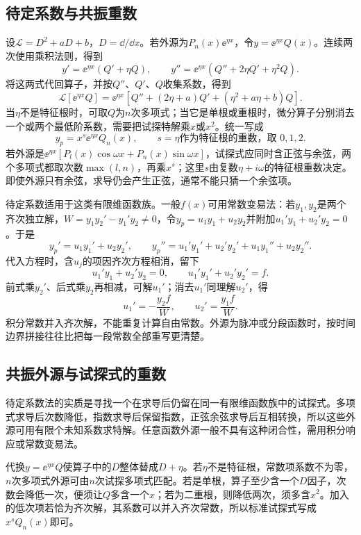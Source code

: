 \subsection{待定系数与共振重数}
设$\mathcal L=D^2+aD+b$，$D=\dd/\dd x$。若外源为$P_n(x)\ee^{\eta x}$，令$y=\ee^{\eta x}Q(x)$。连续两次使用乘积法则，得到
\[
 y'=\ee^{\eta x}(Q'+\eta Q),\qquad
 y''=\ee^{\eta x}(Q''+2\eta Q'+\eta^2Q).
\]
将这两式代回算子，并按$Q''$、$Q'$、$Q$收集系数，得到
\begin{equation}\mathcal L[\ee^{\eta x}Q]=\ee^{\eta x}
\left[Q''+(2\eta+a)Q'+(\eta^2+a\eta+b)Q\right].
\end{equation}
当$\eta$不是特征根时，可取$Q$为$n$次多项式；当它是单根或重根时，微分算子分别消去一个或两个最低阶系数，需要把试探特解乘$x$或$x^2$。统一写成
\[y_p=x^s\ee^{\eta x}Q_n(x),\qquad
s=\eta\text{作为特征根的重数，取 }0,1,2.
\]
若外源是$\ee^{\eta x}[P_l(x)\cos\omega x+P_n(x)\sin\omega x]$，试探式应同时含正弦与余弦，两个多项式都取次数$\max(l,n)$，再乘$x^s$；这里$s$由复数$\eta+i\omega$的特征根重数决定。即使外源只有余弦，求导仍会产生正弦，通常不能只猜一个余弦项。

待定系数适用于这类有限维函数族。一般$f(x)$可用常数变易法：若$y_1,y_2$是两个齐次独立解，$W=y_1y_2'-y_1'y_2\ne0$，令$y_p=u_1y_1+u_2y_2$并附加$u_1'y_1+u_2'y_2=0$。于是
\[y_p'=u_1y_1'+u_2y_2',\qquad
y_p''=u_1'y_1'+u_2'y_2'+u_1y_1''+u_2y_2''.\]
代入方程时，含$u_j$的项因齐次方程相消，留下
\[u_1'y_1+u_2'y_2=0,\qquad u_1'y_1'+u_2'y_2'=f.\]
前式乘$y_2'$、后式乘$y_2$再相减，可解$u_1'$；消去$u_1'$同理解$u_2'$，得
\[u_1'=-\frac{y_2f}{W},\qquad u_2'=\frac{y_1f}{W}.
\]
积分常数并入齐次解，不能重复计算自由常数。外源为脉冲或分段函数时，按时间边界拼接往往比把每一段常数全部重写更清楚。

\subsection{共振外源与试探式的重数}
待定系数法的实质是寻找一个在求导后仍留在同一有限维函数族中的试探式。多项式求导后次数降低，指数求导后保留指数，正弦余弦求导后互相转换，所以这些外源可用有限个未知系数求特解。任意函数外源一般不具有这种闭合性，需用积分响应或常数变易法。

代换$y=\ee^{\eta x}Q$使算子中的$D$整体替成$D+\eta$。若$\eta$不是特征根，常数项系数不为零，$n$次多项式外源可由$n$次试探多项式匹配。若是单根，算子至少含一个$D$因子，次数会降低一次，便须让$Q$多含一个$x$；若为二重根，则降低两次，须多含$x^2$。加入的低次项若恰为齐次解，其系数可以并入齐次常数，所以标准试探式写成$x^sQ_n(x)$即可。

